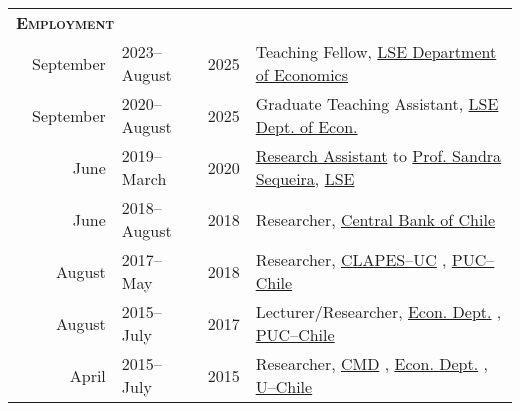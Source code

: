\begin{tabular}{lrlll}
	
	\multicolumn{3}{l}{
		\large
		\textbf{%
			\textsc{%
				Employment
			}
		}
	}
	\\[2ex]
	
	  \indent
	& September
	& 2023--August
	& 2025
	& Teaching Fellow,
	\href{%
			https://www.lse.ac.uk/economics%
		}
		{LSE Department of Economics}
	\\
	
	& September
	& 2020--August
	& 2025
	& Graduate Teaching Assistant,
	\href{%
			https://www.lse.ac.uk/economics%
		}
		{LSE Dept. of Econ.}
	\\
	
	& June
	& 2019--March
	& 2020
	& 
		\href{%
			https://drive.google.com/file/d/1Nn5BeHOv2M4HhVNwtuzPtTAY8rVanidg/view%
		}
		{Research Assistant}
		to
		\href{%
			https://sites.google.com/view/sandramgsequeira/home%
		}
		{Prof. Sandra Sequeira},
		\href{%
			https://www.lse.ac.uk/%
		}
		{LSE}
	\\
	
	& June
	& 2018--August
	& 2018
	& Researcher,
		\href{%
			https://www.bcentral.cl/en/home%
		}
		{Central Bank of Chile}
	\\
	
	& August
	& 2017--May
	& 2018
	& Researcher,
		\href{%
			https://clapesuc.cl/%
		}
		{CLAPES--UC}%
		,
		\href{%
			https://www.uc.cl/en%
		}
		{PUC--Chile}
	\\
	
	& August
	& 2015--July
	& 2017
	& Lecturer/Researcher,
		\href{%
			https://economia.uc.cl/%
		}
		{Econ. Dept.}%
		,
		\href{%
			https://www.uc.cl/en%
		}
		{PUC--Chile}
	\\
	
	& April
	& 2015--July
	& 2015
	& Researcher,
		\href{%
			http://www.microdatos.cl/%
		}
		{CMD}%
		,
		\href{%
			https://econ.uchile.cl%
		}
		{Econ. Dept.}%
		,
		\href{%
			https://uchile.cl/english%
		}
		{U--Chile}
	\\
	
\end{tabular}